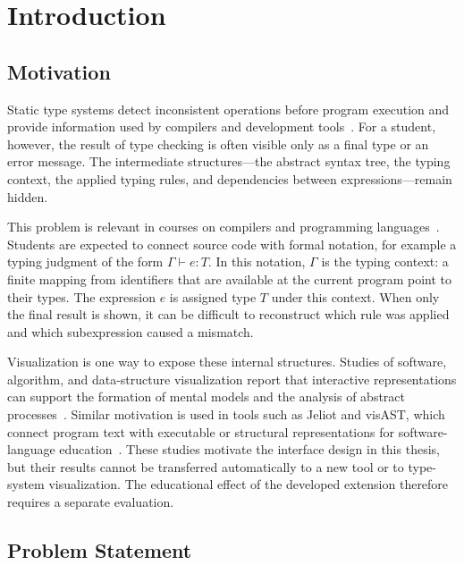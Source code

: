 ﻿\chapter{Introduction}
\label{chap:intro}

\section{Motivation}

Static type systems detect inconsistent operations before program execution and provide information used by compilers and development tools~\cite{Types,HarperPFPL,Gao2017TypeNotType,Hanenberg2010StaticDynamic}. For a student, however, the result of type checking is often visible only as a final type or an error message. The intermediate structures---the abstract syntax tree, the typing context, the applied typing rules, and dependencies between expressions---remain hidden.

This problem is relevant in courses on compilers and programming languages~\cite{DragonBook,Types}. Students are expected to connect source code with formal notation, for example a typing judgment of the form $\Gamma \vdash e : T$. In this notation, $\Gamma$ is the typing context: a finite mapping from identifiers that are available at the current program point to their types. The expression $e$ is assigned type $T$ under this context. When only the final result is shown, it can be difficult to reconstruct which rule was applied and which subexpression caused a mismatch.

Visualization is one way to expose these internal structures. Studies of software, algorithm, and data-structure visualization report that interactive representations can support the formation of mental models and the analysis of abstract processes~\cite{Price1993Taxonomy,Hundhausen2002MetaStudy,Naps2002Engagement,Sorva2013Review,EducationalTechnologyResearch}. Similar motivation is used in tools such as Jeliot and visAST, which connect program text with executable or structural representations for software-language education~\cite{Jeliot3,VisAST}. These studies motivate the interface design in this thesis, but their results cannot be transferred automatically to a new tool or to type-system visualization. The educational effect of the developed extension therefore requires a separate evaluation.

\section{Problem Statement}

